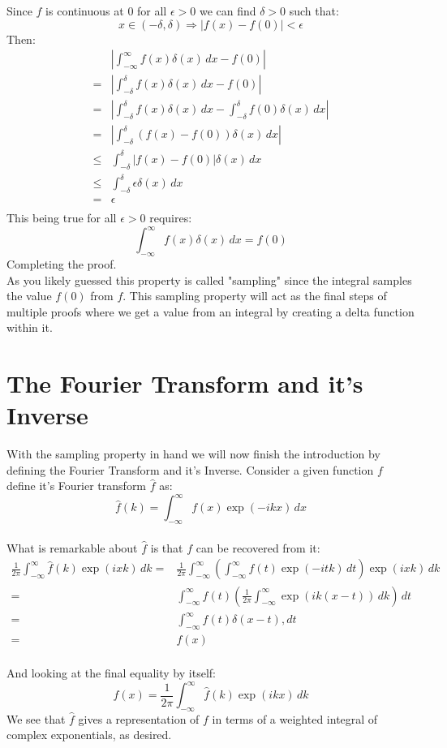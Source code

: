 Since $f$ is continuous at $0$ for all $\epsilon > 0$ we can find $\delta > 0$ such that:
\[x \in (-\delta,\delta) \Rightarrow |f(x)-f(0)| < \epsilon\]
Then:
\begin{equation*}
\begin{aligned}
	&\left|\int_{-\infty}^{\infty}f(x)\delta(x)\,dx-f(0)\right| \\
	=&\left|\int_{-\delta}^{\delta}f(x)\delta(x)\,dx-f(0)\right| \\
	=&\left|\int_{-\delta}^{\delta}f(x)\delta(x)\,dx-\int_{-\delta}^{\delta}f(0)\delta(x)\,dx\right| \\
	=&\left|\int_{-\delta}^{\delta}(f(x)-f(0))\delta(x)\,dx\right| \\
	\leq&\int_{-\delta}^{\delta}|f(x)-f(0)|\delta(x)\,dx \\
	\leq&\int_{-\delta}^{\delta}\epsilon\delta(x)\,dx \\
	=&\epsilon \\
\end{aligned}
\end{equation*}
This being true for all $\epsilon>0$ requires:
	\[\int_{-\infty}^{\infty}f(x)\delta(x)\,dx = f(0)\]
Completing the proof.
\\

As you likely guessed this property is called "sampling" since the integral samples the value $f(0)$ from $f$.
This sampling property will act as the final steps of multiple proofs where we get a value from an integral by creating a delta function within it.

\section{The Fourier Transform and it's Inverse}
With the sampling property in hand we will now finish the introduction by defining the Fourier Transform and it's Inverse.
Consider a given function $f$ define it's Fourier transform $\hat{f}$ as:
\[\hat{f}(k) = \int_{-\infty}^{\infty}f(x)\exp(-ikx)\,dx\]
\\

What is remarkable about $\hat{f}$ is that $f$ can be recovered from it:
\label{sec:inv-trans}
\begin{equation*}
\begin{aligned}
	\frac{1}{2\pi}\int_{-\infty}^{\infty}\hat{f}(k)\exp(ixk)\,dk 
	=& \frac{1}{2\pi}\int_{-\infty}^{\infty}\left(\int_{-\infty}^{\infty}f(t)\exp(-itk)\,dt\right)\exp(ixk)\,dk \\
	=& \int_{-\infty}^{\infty}f(t)\left(\frac{1}{2\pi}\int_{-\infty}^{\infty}\exp(ik(x-t))\,dk\right)\,dt \\
	=& \int_{-\infty}^{\infty}f(t)\delta(x-t),dt \\
	=& f(x) \\
\end{aligned}
\end{equation*}

And looking at the final equality by itself:
\[f(x) = \frac{1}{2\pi}\int_{-\infty}^{\infty}\hat{f}(k)\exp(ikx)\,dk\]
We see that $\hat{f}$ gives a representation of $f$ in terms of a weighted integral of complex exponentials, as desired.

